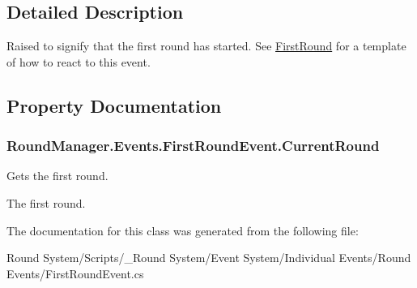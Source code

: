 \subsection{Detailed Description}
Raised to signify that the first round has started. See \hyperlink{class_round_manager_1_1_first_round}{First\+Round} for a template of how to react to this event. 



\subsection{Property Documentation}
\hypertarget{class_round_manager_1_1_events_1_1_first_round_event_ac596413ac1e0d633466dca637229b09e}{}
\subsubsection[{Current\+Round}]{ Round\+Manager.\+Events.\+First\+Round\+Event.\+Current\+Round\hspace{0.3cm}{\ttfamily [get]}}\label{class_round_manager_1_1_events_1_1_first_round_event_ac596413ac1e0d633466dca637229b09e}


Gets the first round. 

The first round.

The documentation for this class was generated from the following file\+:\begin{DoxyCompactItemize}
\item 
Round System/\+Scripts/\+\_\+\+Round System/\+Event System/\+Individual Events/\+Round Events/First\+Round\+Event.\+cs\end{DoxyCompactItemize}
